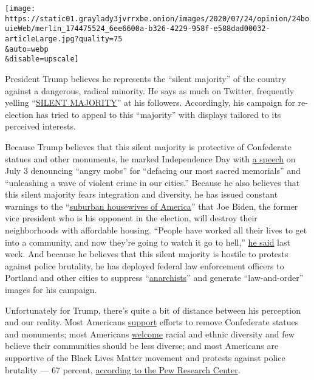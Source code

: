 \texttt{[image: https://static01.graylady3jvrrxbe.onion/images/2020/07/24/opinion/24bouieWeb/merlin\_174475524\_6ee6600a-b326-4229-958f-e588dad00032-articleLarge.jpg?quality=75\\\&auto=webp\\\&disable=upscale]}

President Trump believes he represents the ``silent majority'' of the
country against a dangerous, radical minority. He says as much on
Twitter, frequently yelling
``\href{https://twitter.com/realdonaldtrump/status/1277219673315119106?s=21}{SILENT
MAJORITY}'' at his followers. Accordingly, his campaign for re-election
has tried to appeal to this ``majority'' with displays tailored to its
perceived interests.

Because Trump believes that this silent majority is protective of
Confederate statues and other monuments, he marked Independence Day with
\href{https://www.whitehouse.gov/briefings-statements/remarks-president-trump-south-dakotas-2020-mount-rushmore-fireworks-celebration-keystone-south-dakota/}{a
speech} on July 3 denouncing ``angry mobs'' for ``defacing our most
sacred memorials'' and ``unleashing a wave of violent crime in our
cities.'' Because he also believes that this silent majority fears
integration and diversity, he has issued constant warnings to the
``\href{https://twitter.com/realdonaldtrump/status/1286372175117791236?s=21}{suburban
housewives of America}'' that Joe Biden, the former vice president who
is his opponent in the election, will destroy their neighborhoods with
affordable housing. ``People have worked all their lives to get into a
community, and now they're going to watch it go to hell,''
\href{https://www.npr.org/2020/07/22/893899254/down-in-the-polls-trump-pitches-fear-they-want-to-destroy-our-suburbs}{he
said} last week. And because he believes that this silent majority is
hostile to protests against police brutality, he has deployed federal
law enforcement officers to Portland and other cities to suppress
``\href{https://www.nytimes3xbfgragh.onion/2020/07/21/us/portland-protests.html}{anarchists}''
and generate ``law-and-order'' images for his campaign.

Unfortunately for Trump, there's quite a bit of distance between his
perception and our reality. Most Americans
\href{https://www.cnn.com/2020/06/18/politics/confederate-statues-removal-robert-e-lee-jefferson/index.html}{support}
efforts to remove Confederate statues and monuments; most Americans
\href{https://www.pewsocialtrends.org/2019/05/08/americans-see-advantages-and-challenges-in-countrys-growing-racial-and-ethnic-diversity/}{welcome}
racial and ethnic diversity and few believe their communities should be
less diverse; and most Americans are supportive of the Black Lives
Matter movement and protests against police brutality --- 67 percent,
\href{https://www.pewsocialtrends.org/2020/06/12/amid-protests-majorities-across-racial-and-ethnic-groups-express-support-for-the-black-lives-matter-movement/}{according
to the Pew Research Center}.

